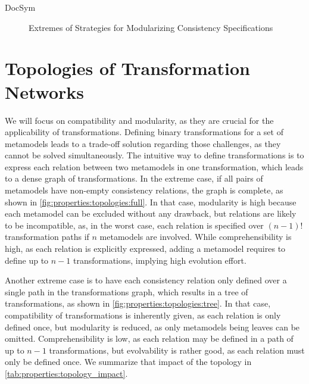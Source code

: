 \begin{copiedFrom}{DocSym}
\begin{figure}
    \centering
    
    \caption{Extremes of Strategies for Modularizing Consistency Specifications}
    \label{fig:topologies:modularization_strategies}
\end{figure}

\section{Topologies of Transformation Networks}

We will focus on compatibility and modularity, as they are crucial for the applicability of transformations. %
Defining binary transformations %
for a set of metamodels leads to a trade-off solution regarding those challenges, as they cannot be solved simultaneously.
The intuitive way to define transformations %
is to express each relation between two metamodels in one transformation, which leads to a dense graph of transformations. %
In the extreme case, if all pairs of metamodels have non-empty consistency relations, the graph is complete, as shown in \autoref{fig:properties:topologies:full}.
In that case, modularity is high because each metamodel can be excluded without any drawback, %
but relations are likely to be incompatible, as, in the worst case, each relation is specified over $(n-1)!$ transformation paths if $n$ metamodels are involved.
While comprehensibility is high, as each relation is explicitly expressed, adding a metamodel requires to define up to $n-1$ transformations, implying high evolution effort.

Another extreme case is to have each consistency relation only defined over a single path in the transformations graph, which results in a tree of transformations, as shown in \autoref{fig:properties:topologies:tree}.
In that case, compatibility of transformations is inherently given, as each relation is only defined once, but modularity is reduced, as only metamodels being leaves can be omitted.
Comprehensibility is low, as each relation may be defined in a path of up to $n-1$ transformations, but evolvability is rather good, as each relation must only be defined once. %
We summarize that impact of the topology in \autoref{tab:properties:topology_impact}.


\end{copiedFrom}
